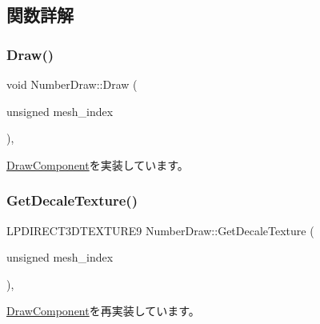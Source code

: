 \subsection{関数詳解}
\mbox{\label{class_number_draw_a8ff9515eb359a04517d7d36321fff0d7}} 
\subsubsection{\texorpdfstring{Draw()}{Draw()}}
{\footnotesize\ttfamily void Number\+Draw\+::\+Draw (\begin{DoxyParamCaption}\item[{unsigned}]{mesh\+\_\+index }\end{DoxyParamCaption})\hspace{0.3cm}{\ttfamily [override]}, {\ttfamily [virtual]}}



\mbox{\hyperlink{class_draw_component_ae84bfb6ccc2fda9e54cdff45057ea2c3}{Draw\+Component}}を実装しています。

\mbox{\label{class_number_draw_a4485821e07841a9d0fe33d5a047ed7d0}} 
\subsubsection{\texorpdfstring{Get\+Decale\+Texture()}{GetDecaleTexture()}}
{\footnotesize\ttfamily L\+P\+D\+I\+R\+E\+C\+T3\+D\+T\+E\+X\+T\+U\+R\+E9 Number\+Draw\+::\+Get\+Decale\+Texture (\begin{DoxyParamCaption}\item[{unsigned}]{mesh\+\_\+index }\end{DoxyParamCaption})\hspace{0.3cm}{\ttfamily [override]}, {\ttfamily [virtual]}}



\mbox{\hyperlink{class_draw_component_a9ea98f4bcdfd76782d5234122b132c3d}{Draw\+Component}}を再実装しています。

\mbox{\label{class_number_draw_a9454f2a7dab2afd1e981c7cf14329659}} 
